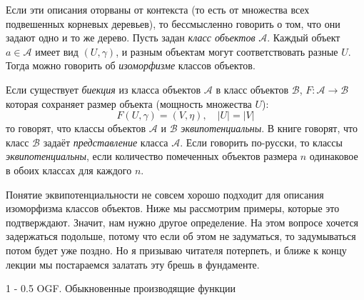 \documentclass[a5paper]{article}
\makeatletter
\theoremstyle{definition}
\renewcommand{\section}{\@startsection
{section}%
{1}%
{\z@}%
{-\baselineskip}%
{0.5\baselineskip}%
{\centering\large\scshape}} %
\makeatother
\begin{document}
Если эти описания оторваны от контекста (то есть от множества всех подвешенных 
корневых деревьев), то бессмысленно говорить о том, что они задают одно и то же 
дерево. Пусть задан \textit{класс объектов} \( \mathcal A \). Каждый объект \( 
a \in \mathcal A \) имеет вид \( (U, \gamma) \), и разным объектам могут 
соответствовать разные \( U \). Тогда можно говорить об \textit{изоморфизме} 
классов объектов.

Если существует \textit{биекция} из класса объектов \( \mathcal A \) в класс 
объектов \( \mathcal B \), \( F \colon \mathcal A \to \mathcal B \) которая 
сохраняет размер объекта (мощность множества \( U \)):
\[
	F(U, \gamma) = (V, \eta), \quad |U| = |V|
\]
то говорят, что классы объектов \( \mathcal A \) и \( \mathcal B \) 
\textit{эквипотенциальны}. 
В книге \cite{gouldenjackson} говорят, что класс \( \mathcal B \) задаёт 
\textit{представление} класса \( \mathcal A \). Если говорить по-русски, то 
классы \textit{эквипотенциальны}, если количество помеченных объектов размера 
\( n \) одинаковое в обоих классах для каждого \( n \).

Понятие эквипотенциальности не совсем хорошо подходит для описания изоморфизма 
классов объектов. Ниже мы рассмотрим примеры, которые это подтверждают. Значит, 
нам нужно другое определение.
На этом вопросе хочется задержаться подольше, потому что если об этом не 
задуматься, то задумываться потом будет уже поздно. Но я призываю читателя 
потерпеть, и ближе к концу лекции мы постараемся залатать эту брешь в 
фундаменте.

\section{OGF. Обыкновенные производящие функции}
\end{document}
